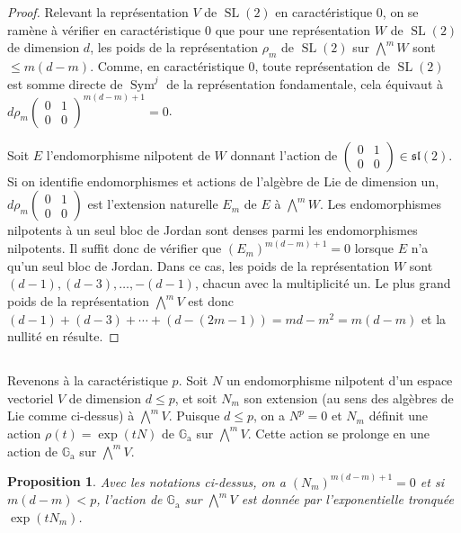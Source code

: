 \documentclass[11pt,a4paper]{article}
\theoremstyle{plain}
\newtheorem{proposition}[theorem]{Proposition}
\theoremstyle{definition}
\DeclareMathOperator{\Sym}{Sym}
\DeclareMathOperator{\SL}{SL}
\newcommand{\Ga}{\mathbb{G}_\mathrm{a}}
\begin{document}
\begin{proof}
Relevant la repr\'esentation $V$ de $\SL(2)$ en caract\'eristique 0, on se ram\`ene \`a v\'erifier en caract\'eristique 0 que pour une repr\'esentation $W$ de $\SL(2)$ de dimension $d$, les poids de la repr\'esentation $\rho_m$ de $\SL(2)$ sur $\bigwedge^m W$ sont $\leq m(d - m)$. Comme, en caract\'eristique 0, toute repr\'esentation de $\SL(2)$ est somme directe de $\Sym^j$ de la repr\'esentation fondamentale, cela \'equivaut \`a $d\rho_m \begin{pmatrix} 0 & 1 \\ 0 & 0 \end{pmatrix}^{m(d-m)+1} = 0$.

Soit $E$ l'endomorphisme nilpotent de $W$ donnant l'action de $\begin{pmatrix} 0 & 1 \\ 0 & 0 \end{pmatrix} \in \mathfrak{sl}(2)$. Si on identifie endomorphismes et actions de l'alg\`ebre de Lie de dimension un, $d\rho_m \begin{pmatrix} 0 & 1 \\ 0 & 0 \end{pmatrix}$ est l'extension naturelle $E_m$ de $E$ \`a $\bigwedge^m W$. Les endomorphismes nilpotents \`a un seul bloc de Jordan sont denses parmi les endomorphismes nilpotents. Il suffit donc de v\'erifier que $(E_m)^{m(d-m)+1} = 0$ lorsque $E$ n'a qu'un seul bloc de Jordan. Dans ce cas, les poids de la repr\'esentation $W$ sont $(d-1), (d-3), \ldots, -(d-1)$, chacun avec la multiplicit\'e un. Le plus grand poids de la repr\'esentation $\bigwedge^m V$ est donc $(d-1) + (d-3) + \cdots + (d - (2m-1)) = md - m^2 = m(d - m)$ et la nullit\'e en r\'esulte.
\end{proof}

\subsection{}
Revenons \`a la caract\'eristique $p$. Soit $N$ un endomorphisme nilpotent d'un espace vectoriel $V$ de dimension $d \leq p$, et soit $N_m$ son extension (au sens des alg\`ebres de Lie comme ci-dessus) \`a $\bigwedge^m V$. Puisque $d \leq p$, on a $N^p = 0$ et $N_m$ d\'efinit une action $\rho(t) = \exp(tN)$ de $\Ga$ sur $\bigwedge^m V$. Cette action se prolonge en une action de $\Ga$ sur $\bigwedge^m V$.

\begin{proposition}\label{prop:5.7}
Avec les notations ci-dessus, on a $(N_m)^{m(d - m) + 1} = 0$ et si $m(d - m) < p$, l'action de $\Ga$ sur $\bigwedge^m V$ est donn\'ee par l'exponentielle tronqu\'ee $\exp(tN_m)$.
\end{proposition}
\end{document}

